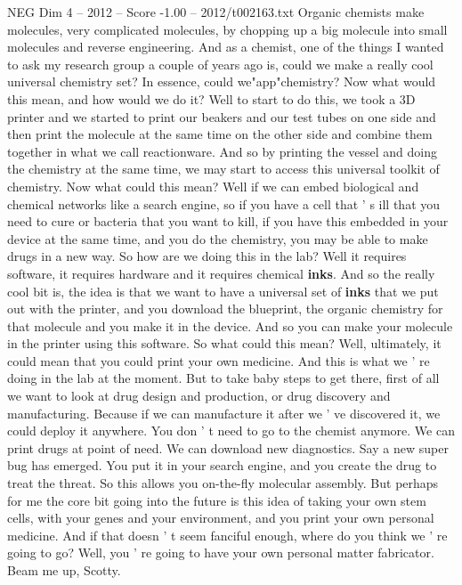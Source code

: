 \begin{textsample}{NEG Dim 4 – 2012 – Score -1.00 – 2012/t002163.txt}  \label{ex:f4_neg_012}
Organic chemists make molecules, very complicated molecules, by chopping up a big molecule into small molecules and reverse engineering.
And as a chemist, one of the things I wanted to ask my research group a couple of years ago is, could we make a really cool universal chemistry set?
In essence, could we"app"chemistry?
Now what would this mean, and how would we do it?
Well to start to do this, we took a 3D printer and we started to print our beakers and our test tubes on one side and then print the molecule at the same time on the other side and combine them together in what we call reactionware.
And so by printing the vessel and doing the chemistry at the same time, we may start to access this universal toolkit of chemistry.
Now what could this mean?
Well if we can embed biological and chemical networks like a search engine, so if you have a cell that ' s ill that you need to cure or bacteria that you want to kill, if you have this embedded in your device at the same time, and you do the chemistry, you may be able to make drugs in a new way.
So how are we doing this in the lab?
Well it requires software, it requires hardware and it requires chemical \textbf{inks}.
And so the really cool bit is, the idea is that we want to have a universal set of \textbf{inks} that we put out with the printer, and you download the blueprint, the organic chemistry for that molecule and you make it in the device.
And so you can make your molecule in the printer using this software.
So what could this mean?
Well, ultimately, it could mean that you could print your own medicine.
And this is what we ' re doing in the lab at the moment.
But to take baby steps to get there, first of all we want to look at drug design and production, or drug discovery and manufacturing.
Because if we can manufacture it after we ' ve discovered it, we could deploy it anywhere.
You don ' t need to go to the chemist anymore.
We can print drugs at point of need.
We can download new diagnostics.
Say a new super bug has emerged.
You put it in your search engine, and you create the drug to treat the threat.
So this allows you on-the-fly molecular assembly.
But perhaps for me the core bit going into the future is this idea of taking your own stem cells, with your genes and your environment, and you print your own personal medicine.
And if that doesn ' t seem fanciful enough, where do you think we ' re going to go?
Well, you ' re going to have your own personal matter fabricator.
Beam me up, Scotty.

\end{textsample}
